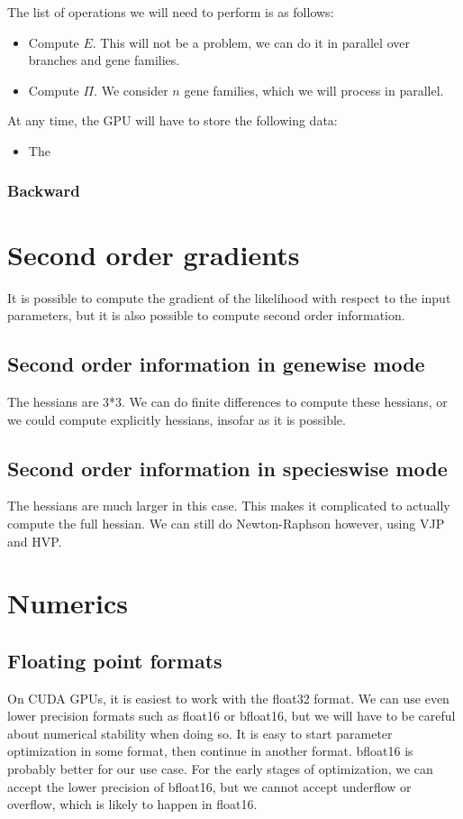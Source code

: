 \documentclass{article}
\newcommand{\1}{\mathbf{1}}
\begin{document}
The list of operations we will need to perform is as follows:
\begin{itemize}
    \item Compute $E$. This will not be a problem, we can do it in parallel over branches and gene families.
    \item Compute $\Pi$. We consider $n$ gene families, which we will process in parallel.
\end{itemize}

At any time, the GPU will have to store the following data:
\begin{itemize}
    \item The 
\end{itemize}
\subsubsection{Backward}
\section{Second order gradients}
It is possible to compute the gradient of the likelihood with respect to the input parameters, but it is also possible to compute second order information.
\subsection{Second order information in genewise mode}
The hessians are 3*3. We can do finite differences to compute these hessians, or we could compute explicitly hessians, insofar as it is possible.
\subsection{Second order information in specieswise mode}
The hessians are much larger in this case. This makes it complicated to actually compute the full hessian. We can still do Newton-Raphson however, using VJP and HVP.
\section{Numerics}
\subsection{Floating point formats}
On CUDA GPUs, it is easiest to work with the float32 format. We can use even lower precision formats such as float16 or bfloat16, but we will have to be careful about numerical stability when doing so. It is easy to start parameter optimization in some format, then continue in another format. bfloat16 is probably better for our use case. For the early stages of optimization, we can accept the lower precision of bfloat16, but we cannot accept underflow or overflow, which is likely to happen in float16.
\end{document}
